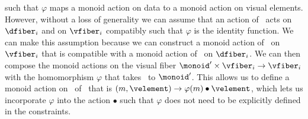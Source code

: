 \documentclass[../main.tex]{subfiles}
\begin{document}
such that $\varphi$ maps a monoid action on data to a monoid action on visual elements. However, 
without a loss of generality we can assume that an action of \monoid\ acts on $\dfiber_{i}$ and on $\vfiber_{i}$ compatibly such that $\varphi$ is the identity function. We can make this assumption because we can construct a monoid action of \monoid\ on $\vfiber_{i}$ that is compatible with a monoid action of \monoid\ on $\dfiber_{i}$. We can then compose the monoid actions on the visual fiber $\monoid^{\prime} \times \vfiber_{i} \rightarrow \vfiber_{i}$ with the homomorphism $\varphi$ that takes \monoid\ to $\monoid^{\prime}$. This allows us to define a monoid action on \vfiber\ of \monoid\ that is $(m, \velement) \rightarrow \varphi(m)\bullet\velement$, which lets us incorporate $\varphi$ into the action $\bullet$ such that $\varphi$ does not need to be explicitly defined in the constraints. 
\end{document}
